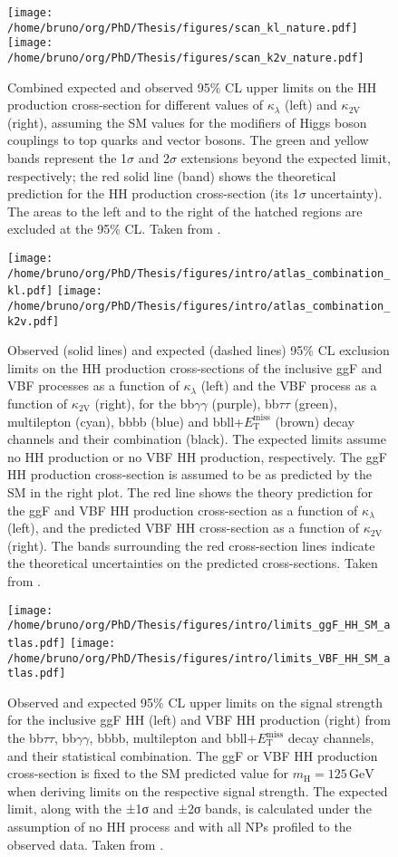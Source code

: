 \documentclass[11pt]{article}
\newcommand{\bbbb}{bbbb}
\newcommand{\bbgg}{bb$\gamma\gamma$}
\newcommand{\bbtt}{bb$\tau\tau$}
\newcommand{\bbll}{bbll+$E^{\text{miss}}_{\text{T}}$}
\newcommand{\kl}{\kappa_{\lambda}}
\newcommand{\kvv}{\kappa_{\text{2V}}}
\newcommand{\mh}{m_{\text{H}}}
\begin{document}
\begin{figure}
\texttt{[image: /home/bruno/org/PhD/Thesis/figures/scan\_kl\_nature.pdf]}
\texttt{[image: /home/bruno/org/PhD/Thesis/figures/scan\_k2v\_nature.pdf]}
\caption{\label{fig:scan_comb_cms_nature}Combined expected and observed 95\% CL upper limits on the HH production cross-section for different values of \(\kl\) (left) and \(\kvv\) (right), assuming the SM values for the modifiers of Higgs boson couplings to top quarks and vector bosons. The green and yellow bands represent the 1\(\sigma\) and 2\(\sigma\) extensions beyond the expected limit, respectively; the red solid line (band) shows the theoretical prediction for the HH production cross-section (its 1\(\sigma\) uncertainty). The areas to the left and to the right of the hatched regions are excluded at the 95\% CL. Taken from \cite{higgs_10_years}.}
\end{figure}

\begin{figure}
\texttt{[image: /home/bruno/org/PhD/Thesis/figures/intro/atlas\_combination\_kl.pdf]}
\texttt{[image: /home/bruno/org/PhD/Thesis/figures/intro/atlas\_combination\_k2v.pdf]}
\caption{\label{fig:scan_comb_atlas}Observed (solid lines) and expected (dashed lines) 95\% CL exclusion limits on the HH production cross-sections of the inclusive \ac{ggF} and \ac{VBF} processes as a function of \(\kl\) (left) and the \ac{VBF} process as a function of \(\kvv\) (right), for the \bbgg{} (purple), \bbtt{} (green), multilepton (cyan), \bbbb{} (blue) and \bbll{} (brown) decay channels and their combination (black). The expected limits assume no HH production or no \ac{VBF} HH production, respectively. The \ac{ggF} HH production cross-section is assumed to be as predicted by the SM in the right plot. The red line shows the theory prediction for the \ac{ggF} and \ac{VBF} HH production cross-section as a function of \(\kl\) (left), and the predicted \ac{VBF} HH cross-section as a function of \(\kvv\) (right). The bands surrounding the red cross-section lines indicate the theoretical uncertainties on the predicted cross-sections. Taken from \cite{atlas_hh_comb}.}
\end{figure}


\begin{figure}
\texttt{[image: /home/bruno/org/PhD/Thesis/figures/intro/limits\_ggF\_HH\_SM\_atlas.pdf]}
\texttt{[image: /home/bruno/org/PhD/Thesis/figures/intro/limits\_VBF\_HH\_SM\_atlas.pdf]}
\caption{\label{fig:limits_comb_atlas}Observed and expected 95\% CL upper limits on the signal strength for the inclusive \ac{ggF} HH (left) and \ac{VBF} HH production (right) from the \bbtt{}, \bbgg{}, \bbbb{}, multilepton and \bbll{} decay channels, and their statistical combination. The \ac{ggF} or \ac{VBF} HH production cross-section is fixed to the SM predicted value for \(\mh=125\,\si{\GeV}\) when deriving limits on the respective signal strength. The expected limit, along with the ±1σ and ±2σ bands, is calculated under the assumption of no HH process and with all NPs profiled to the observed data. Taken from \cite{atlas_hh_comb}.}
\end{figure}
\end{document}
